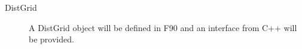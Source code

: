 

\begin{description}

\item [DistGrid] A DistGrid object will be defined in F90 and an interface
from C++ will be provided.

\end{description}



